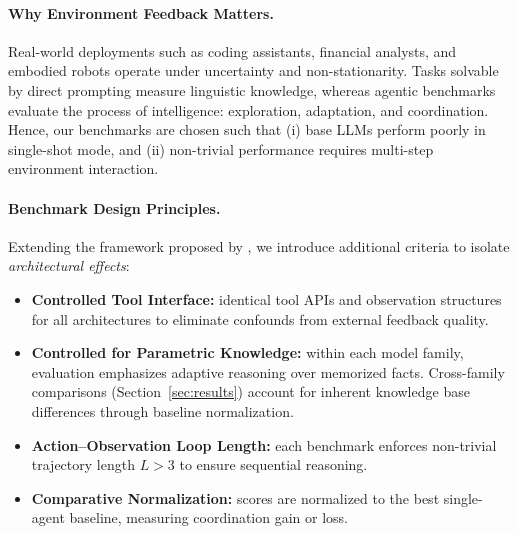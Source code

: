 \vspace{0.4em}
\paragraph{Why Environment Feedback Matters.}
Real-world deployments such as coding assistants, financial analysts, and embodied robots operate under uncertainty and non-stationarity.  
Tasks solvable by direct prompting measure linguistic knowledge, whereas agentic benchmarks evaluate the process of intelligence: exploration, adaptation, and coordination.  
Hence, our benchmarks are chosen such that (i) base LLMs perform poorly in single-shot mode, and (ii) non-trivial performance requires multi-step environment interaction.

\vspace{0.4em}
\paragraph{Benchmark Design Principles.}
Extending the framework proposed by \citet{zhu2025establishing}, we introduce additional criteria to isolate \emph{architectural effects}:

\begin{itemize}
    \item \textbf{Controlled Tool Interface:} identical tool APIs and observation structures for all architectures to eliminate confounds from external feedback quality.
    \item \textbf{Controlled for Parametric Knowledge:} within each model family, evaluation emphasizes adaptive reasoning over memorized facts. Cross-family comparisons (Section~\ref{sec:results}) account for inherent knowledge base differences through baseline normalization.
    \item \textbf{Action–Observation Loop Length:} each benchmark enforces non-trivial trajectory length $L>3$ to ensure sequential reasoning.
    \item \textbf{Comparative Normalization:} scores are normalized to the best single-agent baseline, measuring coordination gain or loss.
\end{itemize}


